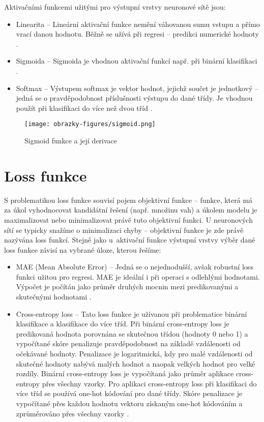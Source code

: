 Aktivačními funkcemi užitými pro výstupní vrstvy neuronové sítě jsou:
\begin{itemize}
    \item Linearita -- Lineární aktivační funkce nemění váhovanou sumu vstupu a přímo vrací danou hodnotu. Běžně se užívá při regresi -- predikci numerické hodnoty \cite{HowToChooseActivationFunction}.
    \item Sigmoida -- Sigmoida je vhodnou aktivační funkcí např. při binární klasifikaci \cite{HowToChooseActivationFunction}.
    \item Softmax -- Výstupem softmax je vektor hodnot, jejichž součet je jednotkový -- jedná se o pravděpodobnost příslušnosti výstupu do dané třídy. Je vhodnou použít při klasifikaci do více než dvou tříd \cite{HowToChooseActivationFunction}. 
\end{itemize}

\begin{figure}[!htbp]
    \centering
    \texttt{[image: obrazky-figures/sigmoid.png]}
    \caption{Sigmoid funkce a její derivace \cite{VanishingGradientProblem}}
    \label{fig:sigmoid}
\end{figure}


\section{Loss funkce}
\label{section:loss}
S problematikou loss funkce souvisí pojem objektivní funkce -- funkce, která má za úkol vyhodnocovat kandidátní řešení (např. množinu vah) a úkolem modelu je maximalizovat nebo minimalizovat právě tuto objektivní funkci. U neuronových sítí se typicky snažíme o minimalizaci chyby -- objektivní funkce je zde právě nazývána loss funkcí. Stejně jako u~aktivační funkce výstupní vrstvy výběr dané loss funkce závisí na vybrané úloze, kterou řešíme:
\begin{itemize}
    \item MAE (Mean Absolute Error) -- Jedná se o nejednodušší, avšak robustní loss funkci užitou pro regresi. MAE je ideální i při operaci s odlehlými hodnotami. Výpočet je počítán jako průměr druhých mocnin mezi predikovanými a skutečnými hodnotami \cite{LossFunctions}.
    \item Cross-entropy loss -- Tato loss funkce je užívanou při problematice binární klasifikace a klasifikace do více tříd. Při binární cross-entropy loss je predikovaná hodnota porovnána se skutečnou třídou (hodnoty 0 nebo 1) a vypočítané skóre penalizuje pravděpodobnost na základě vzdálenosti od očekávané hodnoty. Penalizace je logaritmická, kdy pro malé vzdálenosti od skutečné hodnoty nabývá malých hodnot a naopak velkých hodnot pro velké rozdíly. Binární cross-entropy loss je vypočítaná jako průměr aplikace cross-entropy přes všechny vzorky. Pro aplikaci cross-entropy loss při klasifikaci do více tříd se používá one-hot kódování pro dané třídy. Skóre penalizace je vypočítané přes každou hodnotu vektoru získaným one-hot kódováním a zprůměrováno přes všechny vzorky \cite{LossFunctions}.
\end{itemize}
